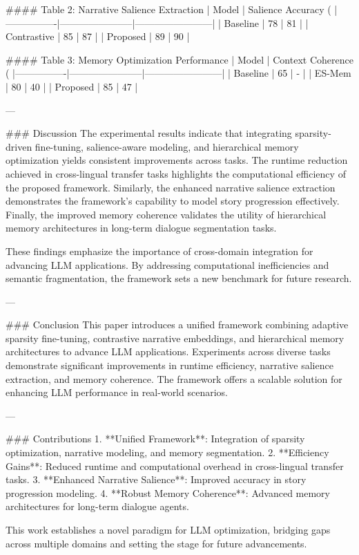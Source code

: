 #### Table 2: Narrative Salience Extraction
| Model          | Salience Accuracy (%
|----------------|-----------------------|------------------------|
| Baseline       | 78                    | 81                     |
| Contrastive    | 85                    | 87                     |
| Proposed       | 89                    | 90                     |

#### Table 3: Memory Optimization Performance
| Model          | Context Coherence (%
|----------------|-----------------------|------------------------|
| Baseline       | 65                    | -                      |
| ES-Mem         | 80                    | 40                     |
| Proposed       | 85                    | 47                     |

---

### Discussion
The experimental results indicate that integrating sparsity-driven fine-tuning, salience-aware modeling, and hierarchical memory optimization yields consistent improvements across tasks. The runtime reduction achieved in cross-lingual transfer tasks highlights the computational efficiency of the proposed framework. Similarly, the enhanced narrative salience extraction demonstrates the framework's capability to model story progression effectively. Finally, the improved memory coherence validates the utility of hierarchical memory architectures in long-term dialogue segmentation tasks.

These findings emphasize the importance of cross-domain integration for advancing LLM applications. By addressing computational inefficiencies and semantic fragmentation, the framework sets a new benchmark for future research.

---

### Conclusion
This paper introduces a unified framework combining adaptive sparsity fine-tuning, contrastive narrative embeddings, and hierarchical memory architectures to advance LLM applications. Experiments across diverse tasks demonstrate significant improvements in runtime efficiency, narrative salience extraction, and memory coherence. The framework offers a scalable solution for enhancing LLM performance in real-world scenarios.

---

### Contributions
1. **Unified Framework**: Integration of sparsity optimization, narrative modeling, and memory segmentation.
2. **Efficiency Gains**: Reduced runtime and computational overhead in cross-lingual transfer tasks.
3. **Enhanced Narrative Salience**: Improved accuracy in story progression modeling.
4. **Robust Memory Coherence**: Advanced memory architectures for long-term dialogue agents.

This work establishes a novel paradigm for LLM optimization, bridging gaps across multiple domains and setting the stage for future advancements.